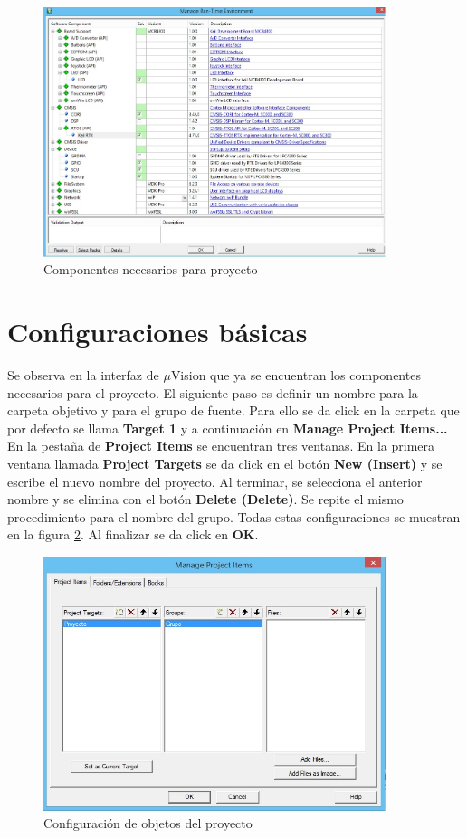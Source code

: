 \documentclass[12pt, twoside]{report}
\begin{document}
\begin{figure}[H]
	\centering
	\includegraphics[width=100mm]{comrtos}
	\caption{Componentes necesarios para proyecto}
	\label{cap1:003}
\end{figure}

\section{Configuraciones básicas}

Se observa en la interfaz de $\mu$Vision que ya se encuentran los componentes necesarios para el proyecto. El siguiente paso es definir un nombre para la carpeta objetivo y para el grupo de fuente. Para ello se da click en la carpeta que por defecto se llama \textbf{Target 1} y a continuación en \textbf{Manage Project Items...} En la pestaña de \textbf{Project Items} se encuentran tres ventanas. En la primera ventana llamada \textbf{Project Targets} se da click en el botón \textbf{New (Insert)} y se escribe el nuevo nombre del proyecto. Al terminar, se selecciona el anterior nombre y se elimina con el botón \textbf{Delete (Delete)}. Se repite el mismo procedimiento para el nombre del grupo. Todas estas configuraciones se muestran en la figura \ref{cap1:004}. Al finalizar se da click en \textbf{OK}.

\begin{figure}[H]
	\centering
	\includegraphics[width=100mm]{progrupo}
	\caption{Configuración de objetos del proyecto}
	\label{cap1:004}
\end{figure}
\end{document}
